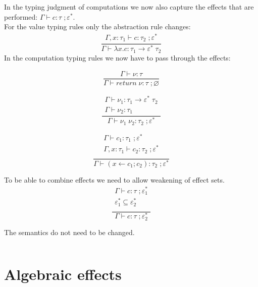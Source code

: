 \documentclass[12pt]{article}
\newcommand\eff[0]{\varepsilon}
\newcommand\effs[0]{\eff^*}
\newcommand\type[0]{\tau}
\newcommand\tarre[3]{#1 \rightarrow #2 \; #3}
\newcommand\val[0]{\nu}
\newcommand\vabs[2]{\lambda #1 . #2}
\newcommand\comp[0]{c}
\newcommand\creturn[1]{\textit{return} \; #1}
\newcommand\capp[2]{#1 \; #2}
\newcommand\cdo[3]{#1 \leftarrow #2 ; #3}
\begin{document}
In the typing judgment of computations we now also capture the effects that are performed: $\Gamma \vdash \comp : \type \; ; \effs$. \\
For the value typing rules only the abstraction rule changes:
\[\frac{
	\begin{array}{l}
	\Gamma, x : \type_1 \vdash \comp : \type_2 \; ; \effs
	\end{array}
}{
	\Gamma \vdash \vabs{x}{\comp} : \tarre{\type_1}{\effs}{\type_2}
}\]
In the computation typing rules we now have to pass through the effects:
\begin{minipage}{0.33\textwidth}
\[\frac{
	\begin{array}{l}
	\Gamma \vdash \val : \type
	\end{array}
}{
	\Gamma \vdash \creturn{\val} : \type \; ; \varnothing
}\]
\end{minipage}
\begin{minipage}{0.33\textwidth}
\[\frac{
	\begin{array}{l}
	\Gamma \vdash \val_1 : \tarre{\type_1}{\effs}{\type_2} \\
	\Gamma \vdash \val_2 : \type_1
	\end{array}
}{
	\Gamma \vdash \capp{\val_1}{\val_2} : \type_2 \; ; \effs
}\]
\end{minipage}
\begin{minipage}{0.33\textwidth}
\[\frac{
	\begin{array}{l}
	\Gamma \vdash \comp_1 : \type_1 \; ; \effs \\
	\Gamma , x : \type_1 \vdash \comp_2 : \type_2 \; ; \effs \\
	\end{array}
}{
	\Gamma \vdash (\cdo{x}{\comp_1}{\comp_2}) : \type_2 \; ; \effs
}\]
\end{minipage}

To be able to combine effects we need to allow weakening of effect sets.
\[\frac{
	\begin{array}{l}
	\Gamma \vdash \comp : \type \; ; \effs_1 \\
	\effs_1 \subseteq \effs_2 \\
	\end{array}
}{
	\Gamma \vdash \comp : \type \; ; \effs_2
}\]

The semantics do not need to be changed.
\newpage
\inputminted{haskell}{code2.txt}

\newpage
\section{Algebraic effects}
\end{document}
